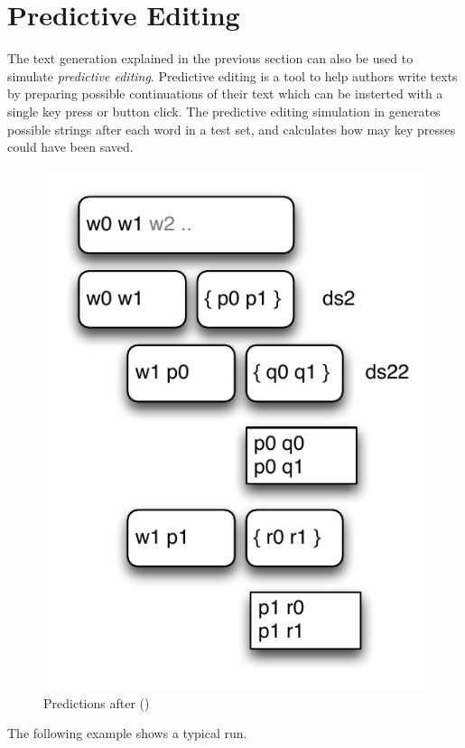 \documentclass[a4paper,10pt,twoside]{report}
\begin{document}
\section{Predictive Editing}

The text generation explained in the previous section can also be used to
simulate \emph{predictive editing}. Predictive editing is a tool to help authors
write texts by preparing possible continuations of their text which can be
insterted with a single key press or button click. The predictive editing
simulation in \wopr{} generates possible strings after each word in a test set,
and calculates how may key presses could have been saved.

\begin{figure}[h!]
\centering
\includegraphics[width=\pdfwidth]{predit_w0w1.pdf}
\caption{Predictions after  ()}
\label{fig:predit_w0w1.pdf}
\end{figure}

The following example shows a typical run.
\end{document}

